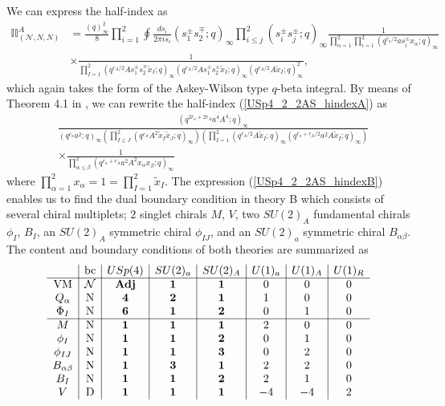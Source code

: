 \documentclass[12pt]{article}
\numberwithin{equation}{section}
\begin{document}
We can express the half-index as
\begin{align}
\label{USp4_2_2AS_hindexA}
\mathbb{II}_{(\mathcal{N},N,N)}^{A}
&=\frac{(q)_{\infty}^2}{8} \prod_{i=1}^2 \oint \frac{ds_i}{2\pi i s_i}
(s_1^{\pm} s_2^{\mp}; q)_{\infty} \prod_{i \le j}^2 (s_i^{\pm} s_j^{\pm}; q)_{\infty}
\frac{1}{\prod_{\alpha = 1}^2 \prod_{i = 1}^2 (q^{r_a/2} a s_i^{\pm} x_{\alpha}; q)_{\infty}}
\nonumber \\
& \times
\frac{1}{\prod_{I = 1}^2 (q^{r_A/2} A s_1^{\pm} s_2^{\mp} \tilde{x}_I; q)_{\infty} (q^{r_A/2} A s_1^{\pm} s_2^{\pm} \tilde{x}_I; q)_{\infty} (q^{r_A/2} A \tilde{x}_I; q)_{\infty}^2}, 
\end{align}
which again takes the form of the Askey-Wilson type $q$-beta integral. 
By means of Theorem 4.1 in \cite{MR1266569}, 
we can rewrite the half-index (\ref{USp4_2_2AS_hindexA}) as
\begin{align}
\label{USp4_2_2AS_hindexB}
&
\frac{(q^{2r_a + 2r_A} a^4 A^4; q)_{\infty}}
{(q^{r_a} a^2; q)_{\infty} \left( \prod_{I \le J}^{2} (q^{r_A} A^2 \tilde{x}_I \tilde{x}_J; q)_{\infty} \right) \left( \prod_{I=1}^{2} (q^{r_A/2} A \tilde{x}_I; q)_{\infty} (q^{r_a + r_A/2} a^2 A \tilde{x}_I; q)_{\infty} \right)}
\nonumber\\
&\times 
\frac{1}{
\prod_{\alpha \le \beta}^{2} (q^{r_a + r_A} a^2 A^2 x_{\alpha} x_{\beta}; q)_{\infty}
}
\end{align}
where $\prod_{\alpha = 1}^2 x_{\alpha} = 1 = \prod_{I = 1}^2 \tilde{x}_I$. 
The expression (\ref{USp4_2_2AS_hindexB}) enables us to find the dual boundary condition in theory B 
which consists of several chiral multiplets; 
$2$ singlet chirals $M$, $V$, 
two $SU(2)_A$ fundamental chirals $\phi_I$, $B_{I}$, 
an $SU(2)_A$ symmetric chiral $\phi_{IJ}$, 
and an $SU(2)_a$ symmetric chiral $B_{\alpha\beta}$. 
The content and boundary conditions of both theories are summarized as
\begin{align}
\label{USp4_2_2AS_charges}
\begin{array}{c|c|c|c|c|c|c|c}
& \textrm{bc} & USp(4) & SU(2)_a & SU(2)_A & U(1)_a & U(1)_A & U(1)_R \\ \hline
\textrm{VM} & \mathcal{N} & {\bf Adj} & {\bf 1} & {\bf 1} & 0 & 0 & 0 \\
Q_{\alpha} & \textrm{N} & {\bf 4} & {\bf 2} & {\bf 1} & 1 & 0 & 0 \\
\Phi_I & \textrm{N} & {\bf 6} & {\bf 1} & {\bf 2} & 0 & 1 & 0 \\
 \hline
M & \textrm{N} & {\bf 1} & {\bf 1} & {\bf 1} & 2 & 0 & 0 \\
\phi_I & \textrm{N} & {\bf 1} & {\bf 1} & {\bf 2} & 0 & 1 & 0 \\
\phi_{IJ} & \textrm{N} & {\bf 1} & {\bf 1} & {\bf 3} & 0 & 2 & 0 \\
B_{\alpha \beta} & \textrm{N} & {\bf 1} & {\bf 3} & {\bf 1} & 2 & 2 & 0 \\
B_I & \textrm{N} & {\bf 1} & {\bf 1} & {\bf 2} & 2 & 1 & 0 \\
V & \textrm{D} & {\bf 1} & {\bf 1} & {\bf 1} & -4 & -4 & 2
\end{array}
\end{align}
\end{document}
